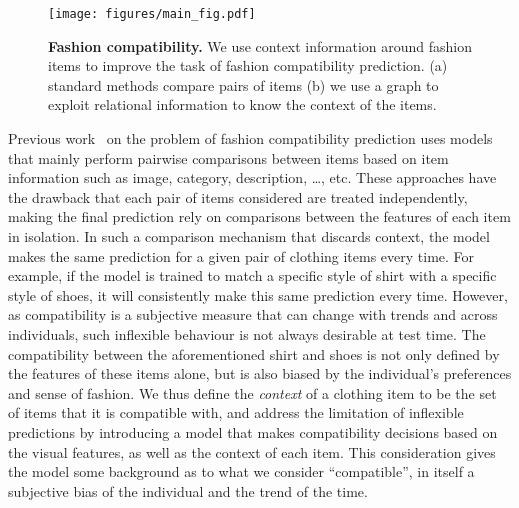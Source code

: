 \documentclass[10pt,twocolumn,letterpaper]{article}
\begin{document}
\begin{figure}[t]
\begin{center}
\texttt{[image: figures/main\_fig.pdf]}
\end{center}
\caption{\textbf{Fashion compatibility.} We use context information around fashion items to improve the task of fashion compatibility prediction. (a) standard methods compare pairs of items (b) we use a graph to exploit relational information to know the context of the items.}
\label{fig:main}
\end{figure}

Previous work~\cite{mcauley2015image, vasileva2018learning} on the problem of fashion compatibility prediction uses models that mainly perform pairwise comparisons between items based on item information such as image, category, description, \dots, etc. 
These approaches have the drawback that each pair of items considered are treated independently, making the final prediction rely on comparisons between the features of each item in isolation. 
In such a comparison mechanism that discards context, the model makes the same prediction for a given pair of clothing items every time.
For example, if the model is trained to match a specific style of shirt with a specific style of shoes, it will consistently make this same prediction every time. However, as compatibility is a subjective measure that can change with trends and across individuals, such inflexible behaviour is not always desirable at test time.
The compatibility between the aforementioned shirt and shoes is not only defined by the features of these items alone, but is also biased by the individual's preferences and sense of fashion. We thus define the \emph{context} of a clothing item to be the set of items that it is compatible with, and address the limitation of inflexible predictions by introducing a model that makes compatibility decisions based on the visual features, as well as the context of each item.
This consideration gives the model some background as to what we consider ``compatible'', in itself a subjective bias of the individual and the trend of the time.
\end{document}
